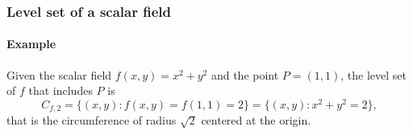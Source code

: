 \begin{frame}
\frametitle{Level set of a scalar field}
\framesubtitle{Example}
Given the scalar field $f(x,y)=x^2+y^2$ and the point $P=(1,1)$, the level set of $f$ that includes $P$ is
\[
C_{f,2} = \{(x,y): f(x,y)=f(1,1)=2\} = \{(x,y): x^2+y^2=2\},
\]
that is the circumference of radius $\sqrt{2}$ centered at the origin.
\begin{center}

\end{center}
\end{frame}



